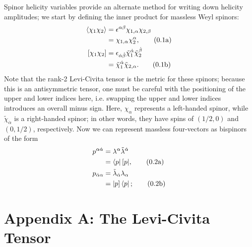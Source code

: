 \documentclass[12pt]{article}
\numberwithin{equation}{section}
\numberwithin{figure}{section}
\numberwithin{table}{section}
\newcommand{\numberthisa}{\addtocounter{equation}{1}\tag{\theequation a}}
\newcommand{\numberthisb}{\addtocounter{equation}{0}\tag{\theequation b}}
\renewcommand{\theequation}{\arabic{section}.\arabic{equation}}
\begin{document}
	Spinor helicity variables provide an alternate method for writing down helicity amplitudes; we start by defining the inner product for massless Weyl spinors:  
	\begin{align*}
	\langle\chi_1\chi_2\rangle & =\epsilon^{\alpha\beta}\chi_{1,\alpha}\chi_{2,\beta}\\
	& =\chi_{1,\alpha}\chi_2^\alpha, \numberthisa\\
	[\chi_1\chi_2] & =\epsilon_{\dot{\alpha}\dot{\beta}}\tilde{\chi}_1^{\dot{\alpha}}\tilde{\chi}_2^{\dot{\beta}}\\
	& =\tilde{\chi}_1^{\dot{\alpha}}\tilde{\chi}_{2,\alpha}. \numberthisb
	\end{align*}
	Note that the rank-2 Levi-Civita tensor is the metric for these spinors; because this is an antisymmetric tensor, one must be careful with the positioning of the upper and lower indices here, i.e. swapping the upper and lower indices introduces an overall minus sign. Here, \(\chi_\alpha\) represents a left-handed spinor, while \(\tilde{\chi}_{\dot{\alpha}}\) is a right-handed spinor; in other words, they have spins of \((1/2,0)\) and \((0,1/2)\), respectively. Now we can represent massless four-vectors as bispinors of the form  
	\begin{align*}
	p^{\alpha\dot{\alpha}} & =\lambda^\alpha\tilde{\lambda}^{\dot{\alpha}}\\
	& =\bra{p}[p|, \numberthisa\\
	p_{\dot{\alpha}\alpha} & =\tilde{\lambda}_{\dot{\alpha}}\lambda_\alpha\\
	& =|p]\bra{p}; \numberthisb
	\end{align*}

        \subsection{}
	
	\section{Appendix A: The Levi-Civita Tensor}
	
\end{document}
